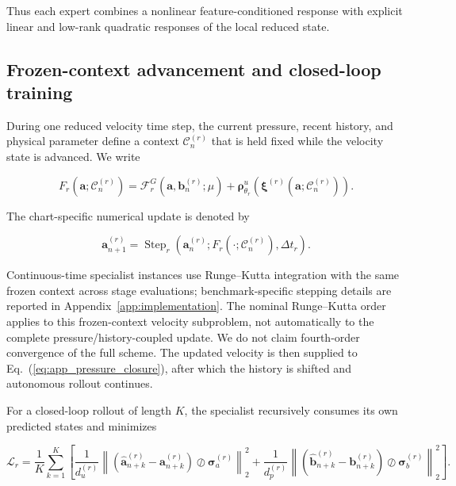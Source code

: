 \documentclass{article}
\def\plaineqref#1{\ref{#1}}
\begin{document}
Thus each expert combines a nonlinear feature-conditioned response with
explicit linear and low-rank quadratic responses of the local reduced state.


\subsection{Frozen-context advancement and closed-loop training}

During one reduced velocity time step, the current pressure, recent history, and
physical parameter define a context $\mathcal C_n^{(r)}$ that is held fixed
while the velocity state is advanced. We write


\begin{equation}
  F_r
  \left(
    \bm a;\mathcal C_n^{(r)}
  \right)
  =
  \mathcal F_r^G
  \left(
    \bm a,\bm b_n^{(r)};\mu
  \right)
  +
  \bm\rho^u_{\theta_r}
  \left(
    \bm\xi^{(r)}
    \left(
      \bm a;\mathcal C_n^{(r)}
    \right)
  \right).
  \label{eq:app_frozen_context_rhs}
\end{equation}


The chart-specific numerical update is denoted by


\begin{equation}
  \bm a_{n+1}^{(r)}
  =
  \operatorname{Step}_r
  \left(
    \bm a_n^{(r)};
    F_r(\cdot;\mathcal C_n^{(r)}),
    \Delta t_r
  \right).
  \label{eq:app_specialist_step}
\end{equation}


Continuous-time specialist instances use Runge--Kutta integration with the
same frozen context across stage evaluations; benchmark-specific stepping
details are reported in Appendix~\ref{app:implementation}.
The nominal Runge--Kutta order applies to this frozen-context velocity subproblem, not automatically to the complete pressure/history-coupled update. We do not claim fourth-order convergence of the full scheme.
The updated velocity is then supplied to
Eq.~(\plaineqref{eq:app_pressure_closure}), after which the history is
shifted and autonomous rollout continues.

For a closed-loop rollout of length $K$, the specialist recursively
consumes its own predicted states and minimizes


\begin{equation}
  \mathcal L_r
  =
  \frac{1}{K}
  \sum_{k=1}^{K}
  \left[
    \frac{1}{d_u^{(r)}}
    \left\|
      \left(
        \widehat{\bm a}_{n+k}^{(r)}
        -
        \bm a_{n+k}^{(r)}
      \right)
      \oslash
      \bm\sigma_a^{(r)}
    \right\|_2^2
    +
    \frac{1}{d_p^{(r)}}
    \left\|
      \left(
        \widehat{\bm b}_{n+k}^{(r)}
        -
        \bm b_{n+k}^{(r)}
      \right)
      \oslash
      \bm\sigma_b^{(r)}
    \right\|_2^2
  \right].
  \label{eq:app_true_rollout_loss}
\end{equation}
\end{document}
